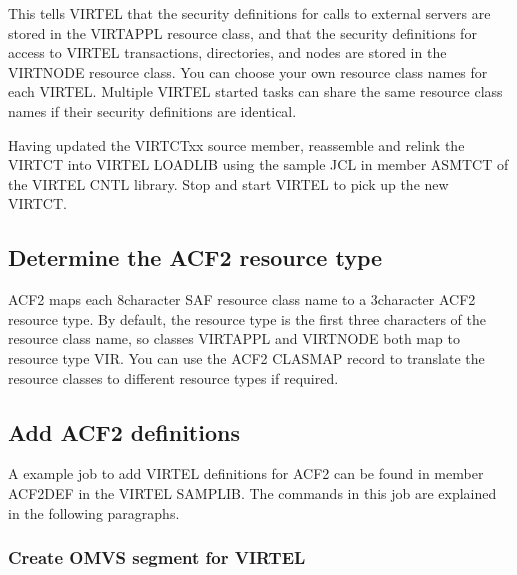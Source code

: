 \documentclass[letterpaper,10pt,english]{sphinxmanual}
\begin{document}
\sphinxAtStartPar
This tells VIRTEL that the security definitions for calls to external servers are stored in the VIRTAPPL resource class, and that the security definitions for access to VIRTEL transactions, directories, and nodes are stored in the VIRTNODE resource class. You can choose your own resource class names for each VIRTEL. Multiple VIRTEL started tasks can share the same resource class names if their security definitions are identical.

\sphinxAtStartPar
Having updated the VIRTCTxx source member, reassemble and relink the VIRTCT into VIRTEL LOADLIB using the sample JCL in member ASMTCT of the VIRTEL CNTL library. Stop and start VIRTEL to pick up the new VIRTCT.


\subsection{Determine the ACF2 resource type}
\label{\detokenize{Installation_Guide:determine-the-acf2-resource-type}}
\sphinxAtStartPar
ACF2 maps each 8\sphinxhyphen{}character SAF resource class name to a 3\sphinxhyphen{}character ACF2 resource type. By default, the resource type is the first three characters of the resource class name, so classes VIRTAPPL and VIRTNODE both map to resource type VIR. You can use the ACF2 CLASMAP record to translate the resource classes to different resource types if required.


\subsection{Add ACF2 definitions}
\label{\detokenize{Installation_Guide:add-acf2-definitions}}
\sphinxAtStartPar
A example job to add VIRTEL definitions for ACF2 can be found in member ACF2DEF in the VIRTEL SAMPLIB. The commands in this job are explained in the following paragraphs.


\subsubsection{Create OMVS segment for VIRTEL}
\label{\detokenize{Installation_Guide:create-omvs-segment-for-virtel}}
\begin{sphinxVerbatim}[commandchars=\\\{\}]
  
    
\end{sphinxVerbatim}
\end{document}
